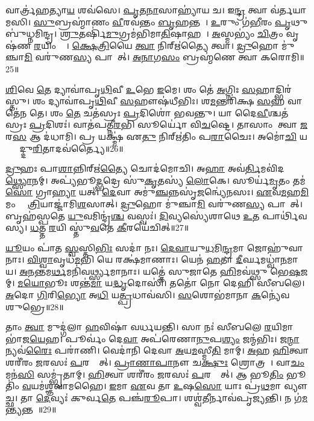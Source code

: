 𑌵𑌾𑌰𑍍𑌤𑍍𑌰॑𑌹𑌤𑍍𑌯𑌾\ul{𑌯} 𑌶𑌵॑𑌸𑍇।
\ul{𑌪𑍃}\ul{𑌤}\ul{𑌨𑌾}𑌸𑌾𑌹𑍍𑌯𑌾॑𑌯 𑌚।
𑌇\ul{𑌨𑍍𑌦𑍍𑌰} 𑌤𑍍𑌵𑌾 𑌵॑𑌰𑍍𑌤𑌯𑌾𑌮𑌸𑌿।
\ul{𑌸𑍁}𑌬𑍍𑌰𑌹𑍍𑌮𑌾॑𑌣𑌂 \ul{𑌵𑍀}𑌰𑌵॑𑌨𑍍𑌤𑌂 \ul{𑌬𑍃}𑌹𑌨𑍍𑌤𑌮𑍍᳚।
\ul{𑌉}𑌰𑍁𑌂 𑌗॑\ul{𑌭𑍀}𑌰𑌂 \ul{𑌪𑍃}𑌥𑍁𑌬𑍁॑𑌧𑍍𑌨𑌮𑌿𑌨𑍍𑌦𑍍𑌰।
\ul{𑌶𑍍𑌰𑍁}𑌤𑌰𑍍\mbox{}𑌷𑌿॑\ul{𑌮𑍁}𑌗𑍍𑌰𑌮॑𑌭𑌿𑌮𑌾\ul{𑌤𑌿}𑌷𑌾𑌹𑌮𑍍᳚।
\ul{𑌅}𑌸𑍍𑌮𑌭𑍍𑌯𑌂॑ \ul{𑌚𑌿}𑌤𑍍𑌰𑌂 𑌵𑍃𑌷॑𑌣 \ul{𑌰}𑌯𑌿𑌂 𑌦𑌾𑌃᳚।
\ul{𑌕𑍍𑌷𑍇}\ul{𑌤𑍍𑌰𑌿}𑌯𑍈 \ul{𑌤𑍍𑌵𑌾} 𑌨𑌿𑌰𑍍\mbox{}𑌋॑𑌤𑍍𑌯𑍈 𑌤𑍍𑌵𑌾।
\ul{𑌦𑍍𑌰𑍁}𑌹𑍋 𑌮𑍁॑𑌞𑍍𑌚𑌾\ul{𑌮𑌿} 𑌵𑌰𑍁॑𑌣\ul{𑌸𑍍𑌯} 𑌪𑌾𑌶𑌾᳚𑌤𑍍।
\ul{𑌅}\ul{𑌨𑌾}𑌗\ul{𑌸𑌂} 𑌬𑍍𑌰𑌹𑍍𑌮॑𑌣𑍇 𑌤𑍍𑌵𑌾 𑌕𑌰𑍋𑌮𑌿॥25॥

\ul{𑌶𑌿}𑌵𑍇 \ul{𑌤𑍇} 𑌦𑍍𑌯𑌾𑌵𑌾॑𑌪𑍃\ul{𑌥𑌿}𑌵𑍀 \ul{𑌉}𑌭𑍇 \ul{𑌇}𑌮𑍇।
𑌶𑌂 𑌤𑍇॑ \ul{𑌅}𑌗𑍍𑌨𑌿𑌃 \ul{𑌸}𑌹𑌾𑌦𑍍𑌭𑌿𑌰॑𑌸𑍍𑌤𑍁।
𑌶𑌂 𑌦𑍍𑌯𑌾𑌵𑌾॑𑌪𑍃\ul{𑌥𑌿}𑌵𑍀 \ul{𑌸}𑌹𑍗𑌷॑𑌧𑍀𑌭𑌿𑌃।
𑌶\ul{𑌮}𑌨𑍍𑌤𑌰𑌿॑𑌕𑍍𑌷 \ul{𑌸}𑌹 𑌵𑌾𑌤𑍇॑𑌨 𑌤𑍇।
𑌶𑌂 \ul{𑌤𑍇} 𑌚𑌤॑𑌸𑍍𑌰𑌃 \ul{𑌪𑍍𑌰}𑌦𑌿𑌶𑍋॑ 𑌭𑌵𑌨𑍍𑌤𑍁।
𑌯𑌾 𑌦𑍈\ul{𑌵𑍀}𑌶𑍍𑌚𑌤॑𑌸𑍍𑌰𑌃 \ul{𑌪𑍍𑌰}𑌦𑌿𑌶𑌃॑।
𑌵𑌾𑌤॑𑌪𑌤𑍍𑌨𑍀\ul{𑌰}𑌭𑌿 𑌸𑍂𑌰𑍍𑌯𑍋॑ 𑌵𑌿\ul{𑌚}𑌷𑍍𑌟𑍇।
𑌤𑌾𑌸𑌾𑌂 𑌤𑍍𑌵𑌾 \ul{𑌜}𑌰\ul{𑌸} 𑌆 𑌦॑𑌧𑌾𑌮𑌿।
𑌪𑍍𑌰 𑌯𑌕𑍍𑌷𑍍𑌮॑ 𑌏\ul{𑌤𑍁} 𑌨𑌿𑌰𑍍\mbox{}𑌋॑𑌤𑌿𑌂 𑌪\ul{𑌰𑌾}𑌚𑍈𑌃।
𑌅𑌮𑍋॑\ul{𑌚𑌿} 𑌯𑌕𑍍𑌷𑍍𑌮𑌾᳚𑌦𑍍𑌦𑍁\ul{𑌰𑌿}𑌤𑌾𑌦𑌵॑𑌰𑍍𑌤𑍍𑌯𑍈॥26॥

\ul{𑌦𑍍𑌰𑍁}𑌹𑌃 𑌪𑌾\ul{𑌶𑌾}𑌨𑍍𑌨𑌿𑌰𑍍\mbox{}𑌋॑\ul{𑌤𑍍𑌯𑍈} 𑌚𑍋𑌦॑𑌮𑍋𑌚𑌿।
𑌅\ul{𑌹𑌾} 𑌅𑌵॑\ul{𑌰𑍍𑌤𑌿}𑌮𑌵𑌿॑𑌦\ul{𑌥𑍍𑌸𑍍𑌯𑍋}𑌨𑌮𑍍।
𑌅𑌪𑍍𑌯॑𑌭𑍂\ul{𑌦𑍍𑌭}𑌦𑍍𑌰𑍇 𑌸𑍁॑\ul{𑌕𑍃}𑌤𑌸𑍍𑌯॑ \ul{𑌲𑍋}𑌕𑍇।
𑌸𑍂𑌰𑍍𑌯॑\ul{𑌮𑍃}𑌤𑌂 𑌤𑌮॑\ul{𑌸𑍋} 𑌗𑍍𑌰𑌾\ul{𑌹𑍍𑌯𑌾} 𑌯𑌤𑍍।
\ul{𑌦𑍇}𑌵𑌾 𑌅𑌮𑍁॑\ul{𑌞𑍍𑌚}𑌨𑍍𑌨𑌸𑍃॑\ul{𑌜}𑌨𑍍𑌵𑍍𑌯𑍇॑𑌨𑌸𑌃।
\ul{𑌏}𑌵\ul{𑌮}𑌹\ul{𑌮𑌿}𑌮𑌂 𑌕𑍍𑌷𑍇᳚\ul{𑌤𑍍𑌰𑌿}𑌯𑌾𑌜𑍍𑌜𑌾॑𑌮𑌿\ul{𑌶}\ul{}𑌸𑌾𑌤𑍍।
\ul{𑌦𑍍𑌰𑍁}𑌹𑍋 𑌮𑍁॑𑌞𑍍𑌚𑌾\ul{𑌮𑌿} 𑌵𑌰𑍁॑𑌣\ul{𑌸𑍍𑌯} 𑌪𑌾𑌶𑌾᳚𑌤𑍍।
𑌬𑍃𑌹॑𑌸𑍍𑌪𑌤𑍇 \ul{𑌯𑍁}𑌵𑌮𑌿𑌨𑍍𑌦𑍍𑌰॑\ul{𑌶𑍍𑌚} 𑌵𑌸𑍍𑌵𑌃॑।
\ul{𑌦𑌿}𑌵𑍍𑌯𑌸𑍍𑌯𑍇॑𑌶𑌾𑌥𑍇 \ul{𑌉}𑌤 𑌪𑌾𑌰𑍍𑌥𑌿॑𑌵𑌸𑍍𑌯।
\ul{𑌧}𑌤𑍍𑌤 \ul{𑌰}𑌯𑌿 𑌸𑍍𑌤𑍁॑\ul{𑌵}𑌤𑍇 \ul{𑌕𑍀}𑌰𑌯𑍇॑𑌚𑌿𑌤𑍍॥27॥

\ul{𑌯𑍂}𑌯𑌂 𑌪𑌾॑𑌤 \ul{𑌸𑍍𑌵}𑌸𑍍𑌤𑌿\ul{𑌭𑌿𑌃} 𑌸𑌦𑌾॑ 𑌨𑌃।
\ul{𑌦𑍇}\ul{𑌵𑌾}𑌯𑍁\ul{𑌧}𑌮𑌿\ul{𑌨𑍍𑌦𑍍𑌰}𑌮𑌾 𑌜𑍋𑌹𑍁॑𑌵𑌾𑌨𑌾𑌃।
\ul{𑌵𑌿}\ul{𑌶𑍍𑌵𑌾}𑌵𑍃𑌧॑\ul{𑌮}𑌭𑌿 𑌯𑍇 𑌰𑌕𑍍𑌷॑𑌮𑌾𑌣𑌾𑌃।
𑌯𑍇𑌨॑ \ul{𑌹}𑌤𑌾 \ul{𑌦𑍀}𑌰𑍍𑌘𑌮𑌧𑍍𑌵𑌾॑\ul{𑌨}𑌮𑌾𑌯\sn{}।
\ul{𑌅}\ul{𑌨}𑌨𑍍𑌤𑌮\ul{𑌰𑍍𑌥}𑌮𑌨𑌿॑𑌵𑌰𑍍𑌥𑍍𑌸𑍍𑌯𑌮𑌾𑌨𑌾𑌃।
𑌯𑌤𑍍𑌤𑍇॑ 𑌸𑍁𑌜𑌾𑌤𑍇 \ul{𑌹𑌿}𑌮𑌵॑𑌥𑍍𑌸𑍁 𑌭𑍇\ul{𑌷}𑌜𑌮𑍍।
\ul{𑌮}\ul{𑌯𑍋}𑌭𑍂𑌃 𑌶𑌨𑍍𑌤॑\ul{𑌮𑌾} 𑌯\ul{𑌦𑍍𑌧𑍃}𑌦𑍋𑌸𑌿॑।
𑌤𑌤𑍋॑ 𑌨𑍋 𑌦𑍇𑌹𑌿 𑌸𑍀𑌬𑌲𑍇।
\ul{𑌅}𑌦𑍋 \ul{𑌗𑌿}𑌰𑌿\ul{𑌭𑍍𑌯𑍋} 𑌅\ul{𑌧𑌿} 𑌯\ul{𑌤𑍍𑌪𑍍𑌰}𑌧𑌾𑌵॑𑌸𑌿।
\ul{𑌸}\ul{}𑌶𑍋𑌭॑𑌮𑌾𑌨𑌾 \ul{𑌕}𑌨𑍍𑌯𑍇॑𑌵 𑌶𑍁𑌭𑍍𑌰𑍇॥28॥

𑌤𑌾𑌂 \ul{𑌤𑍍𑌵𑌾} 𑌮𑍁𑌦𑍍𑌗॑𑌲𑌾 \ul{𑌹}𑌵𑌿𑌷𑌾॑ 𑌵𑌰𑍍𑌧𑌯𑌨𑍍𑌤𑌿।
𑌸𑌾 𑌨𑌃॑ 𑌸𑍀𑌬𑌲𑍇 \ul{𑌰}𑌯𑌿𑌮𑌾 𑌭𑌾॑𑌜\ul{𑌯𑍇}𑌹।
𑌪𑍂𑌰𑍍𑌵𑌂॑ 𑌦𑍇\ul{𑌵𑌾} 𑌅𑌪॑𑌰𑍇𑌣𑌾\ul{𑌨𑍁}𑌪\ul{𑌶𑍍𑌯𑌂} 𑌜𑌨𑍍𑌮॑𑌭𑌿𑌃।
𑌜\ul{𑌨𑍍𑌮𑌾}𑌨𑍍𑌯𑌵॑\ul{𑌰𑍈𑌃} 𑌪𑌰𑌾॑𑌣𑌿।
𑌵𑍇𑌦𑌾॑𑌨𑌿 𑌦𑍇𑌵𑌾 \ul{𑌅}𑌯\ul{𑌮}𑌸𑍍𑌮𑍀\ul{𑌤𑌿} 𑌮𑌾𑌮𑍍।
\ul{𑌅}𑌹 \ul{𑌹𑌿}𑌤𑍍𑌵𑌾 𑌶𑌰𑍀॑𑌰𑌂 \ul{𑌜}𑌰𑌸𑌃॑ \ul{𑌪}𑌰𑌸𑍍𑌤𑌾᳚𑌤𑍍।
\ul{𑌪𑍍𑌰𑌾}\ul{𑌣𑌾}\ul{𑌪𑌾}𑌨𑍗 𑌚\ul{𑌕𑍍𑌷𑍁𑌃} 𑌶𑍍𑌰𑍋𑌤𑍍𑌰𑌮𑍍᳚।
𑌵𑌾\ul{𑌚𑌂} 𑌮𑌨॑\ul{𑌸𑌿} 𑌸𑌮𑍍𑌭𑍃॑𑌤𑌾𑌮𑍍।
\ul{𑌹𑌿}𑌤𑍍𑌵𑌾 𑌶𑌰𑍀॑𑌰𑌂 \ul{𑌜}𑌰𑌸𑌃॑ \ul{𑌪}𑌰𑌸𑍍𑌤𑌾᳚𑌤𑍍।
𑌆 𑌭𑍂\ul{𑌤𑌿𑌂} 𑌭𑍂𑌤𑌿𑌂॑ \ul{𑌵}𑌯𑌮॑𑌶𑍍𑌞𑌵𑌾𑌮𑌹𑍈।
\ul{𑌇}𑌮𑌾 \ul{𑌏}𑌵 𑌤𑌾 \ul{𑌉}𑌷\ul{𑌸𑍋} 𑌯𑌾𑌃 𑌪𑍍𑌰॑\ul{𑌥}𑌮𑌾 𑌵𑍍𑌯𑍗𑌚𑍍𑌛\sn{}।
𑌤𑌾 \ul{𑌦𑍇}𑌵𑍍𑌯𑌃॑ 𑌕𑍁𑌰𑍍𑌵\ul{𑌤𑍇} 𑌪𑌞𑍍𑌚॑\ul{𑌰𑍂}𑌪𑌾।
𑌶𑌶𑍍𑌵॑\ul{𑌤𑍀}𑌰𑍍𑌨𑌾𑌵॑𑌪𑍃𑌜𑍍𑌯𑌨𑍍𑌤𑌿।
𑌨 𑌗॑\ul{𑌮}𑌨𑍍𑌤𑍍𑌯𑌨𑍍𑌤𑌮𑍍᳚॥29॥\anuvakamend[\ul{𑌕}\ul{𑌰𑍋}𑌮𑍍𑌯𑌵॑𑌰𑍍𑌤𑍍𑌯𑍈 𑌚𑌿𑌚𑍍𑌛𑍁𑌭𑍍𑌰𑍇\-𑌽𑌶𑍍𑌞𑌵𑌾𑌮𑌹𑍈 \ul{𑌚}𑌤𑍍𑌵𑌾𑌰𑌿॑ 𑌚]

